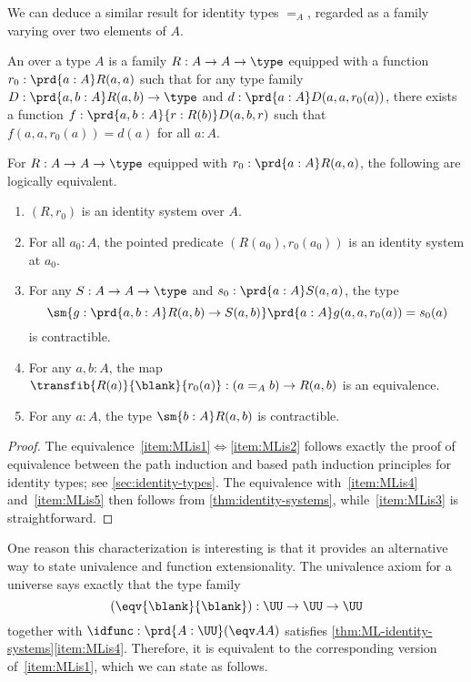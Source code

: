 %

We can deduce a similar result for identity types $=_A$, regarded as a family varying over two elements of $A$.

%

\begin{defn}
  An 
  over a type $A$ is a family $R:A\to A\to \type$ equipped with a function $r_0:\prd{a:A} R(a,a)$ such that for any type family $D:\prd{a,b:A} R(a,b) \to \type$ and $d:\prd{a:A} D(a,a,r_0(a))$, there exists a function $f:\prd{a,b:A}{r:R(b)} D(a,b,r)$ such that $f(a,a,r_0(a))=d(a)$ for all $a:A$.
\end{defn}

\begin{thm}\label{thm:ML-identity-systems}
  For $R:A\to A\to\type$ equipped with $r_0:\prd{a:A} R(a,a)$, the following are logically equivalent.
  \begin{enumerate}
  \item $(R,r_0)$ is an identity system over $A$.\label{item:MLis1}
  \item For all $a_0:A$, the pointed predicate $(R(a_0),r_0(a_0))$ is an identity system at $a_0$.\label{item:MLis2}
  \item For any $S:A\to A\to\type$ and $s_0:\prd{a:A} S(a,a)$, the type
    \[ \sm{g:\prd{a,b:A} R(a,b) \to S(a,b)} \prd{a:A} g(a,a,r_0(a)) = s_0(a) \]
    is contractible.\label{item:MLis3}
  \item For any $a,b:A$, the map $\transfib{R(a)}{\blank}{r_0(a)} : (a =_A b) \to R(a,b)$ is an equivalence.\label{item:MLis4}
  \item For any $a:A$, the type $\sm{b:A} R(a,b)$ is contractible.\label{item:MLis5}
  \end{enumerate}
\end{thm}
\begin{proof}
  The equivalence~\ref{item:MLis1}$\Leftrightarrow$\ref{item:MLis2} follows exactly the proof of equivalence between the path induction and based path induction principles for identity types; see \autoref{sec:identity-types}.
  The equivalence with~\ref{item:MLis4} and~\ref{item:MLis5} then follows from \autoref{thm:identity-systems}, while~\ref{item:MLis3} is straightforward.
\end{proof}

%

One reason this characterization is interesting is that it provides an alternative way to state univalence and function extensionality.
%
The univalence axiom for a universe \UU says exactly that the type family
\[ (\eqv{\blank}{\blank}) : \UU\to\UU\to\UU \]
together with $\idfunc : \prd{A:\UU} (\eqv AA)$ satisfies \autoref{thm:ML-identity-systems}\ref{item:MLis4}.
Therefore, it is equivalent to the corresponding version of~\ref{item:MLis1}, which we can state as follows.

